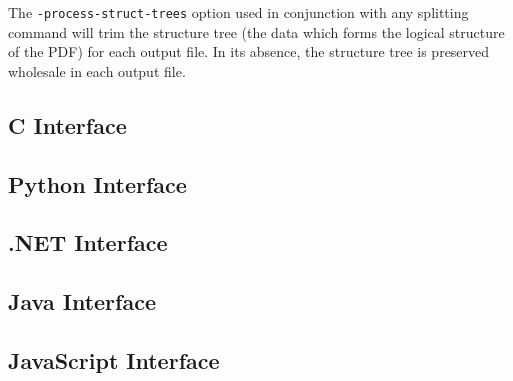 \documentclass{book}
\begin{document}
The \texttt{-process-struct-trees} option used in conjunction with any splitting command will trim the structure tree (the data which forms the logical structure of the PDF) for each output file. In its absence, the structure tree is preserved wholesale in each output file. 

\pagestyle{empty}\thispagestyle{fancy}

\begin{cpdflib}
\clearpage
\section*{C Interface}
\begin{small}\tt

\end{small}
\end{cpdflib}

\begin{pycpdflib}
\clearpage
\section*{Python Interface}
\begin{small}\tt

\end{small}
\end{pycpdflib}

\begin{dotnetcpdflib}
\clearpage
\section*{.NET Interface}
\begin{small}\tt

\end{small}
\end{dotnetcpdflib}

\begin{jcpdflib}
\clearpage
\section*{Java Interface}
\begin{small}\tt

\end{small}
\end{jcpdflib}

\begin{jscpdflib}
\clearpage
\section*{JavaScript Interface}
\begin{small}\tt

\end{small}
\end{jscpdflib}
\end{document}
